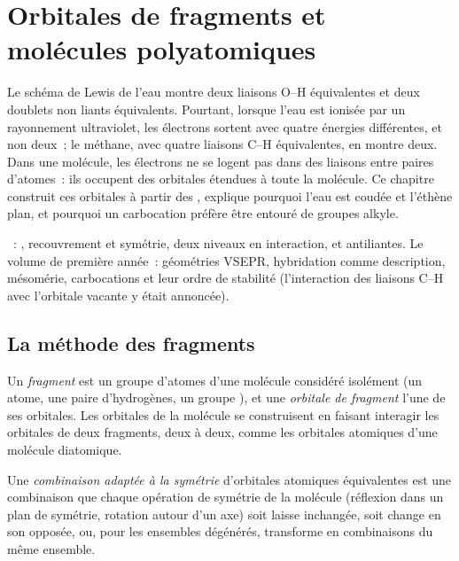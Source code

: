 \chapter{Orbitales de fragments et molécules polyatomiques}\label{ch:b2:fragment-orbitals}

Le schéma de Lewis de l'eau montre deux liaisons O--H équivalentes et deux
doublets non liants équivalents. Pourtant, lorsque l'eau est ionisée par un rayonnement ultraviolet, les
électrons sortent avec quatre énergies différentes, et non deux~; le méthane, avec quatre
liaisons C--H équivalentes, en montre deux. Dans une molécule, les électrons ne se logent pas dans des liaisons
entre paires d'atomes~: ils occupent des orbitales étendues à toute la molécule.
Ce chapitre construit ces orbitales à partir des , explique
pourquoi l'eau est coudée et l'éthène plan, et pourquoi un carbocation préfère être entouré
de groupes alkyle.

\begin{recall}
~: , recouvrement et symétrie, deux niveaux en interaction,
 et antiliantes. Le volume de première année~: géométries VSEPR, hybridation
comme description, mésomérie, carbocations et leur ordre de stabilité (l'interaction des
liaisons C--H avec l'orbitale vacante y était annoncée).
\end{recall}

\section{La méthode des fragments}

\begin{definition}[Fragments]\label{def:b2:fragment-orbitals:fragment}
Un \emph{fragment} est un groupe d'atomes d'une molécule considéré
isolément (un atome, une paire d'hydrogènes, un groupe ), et une \emph{orbitale de
fragment} l'une de ses orbitales. Les orbitales de la
molécule se construisent en faisant interagir les orbitales de deux fragments, deux à
deux, comme les orbitales atomiques d'une molécule diatomique.
\end{definition}

\begin{definition}\label{def:b2:fragment-orbitals:symmetry-adapted}
Une \emph{combinaison adaptée à la symétrie} d'orbitales
atomiques équivalentes est une combinaison que chaque opération de symétrie de la
molécule (réflexion dans un plan de symétrie, rotation autour d'un axe) soit
laisse inchangée, soit change en son opposée, ou, pour les ensembles dégénérés, transforme
en combinaisons du même ensemble.
\end{definition}

